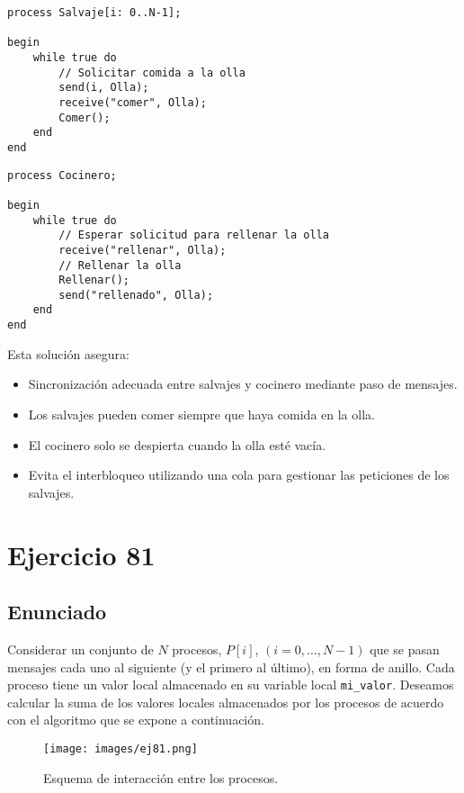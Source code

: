 \documentclass[a4paper,12pt]{article}
\begin{document}
\begin{lstlisting}[style=customcpp, caption={Pseudocódigo del proceso Salvaje}]
process Salvaje[i: 0..N-1];

begin
    while true do
        // Solicitar comida a la olla
        send(i, Olla);
        receive("comer", Olla);
        Comer();
    end
end
\end{lstlisting}

\begin{lstlisting}[style=customcpp, caption={Pseudocódigo del proceso Cocinero}]
process Cocinero;

begin
    while true do
        // Esperar solicitud para rellenar la olla
        receive("rellenar", Olla);
        // Rellenar la olla
        Rellenar();
        send("rellenado", Olla);
    end
end
\end{lstlisting}

Esta solución asegura:

\begin{itemize}
    \item Sincronización adecuada entre salvajes y cocinero mediante paso de mensajes.
    \item Los salvajes pueden comer siempre que haya comida en la olla.
    \item El cocinero solo se despierta cuando la olla esté vacía.
    \item Evita el interbloqueo utilizando una cola para gestionar las peticiones de los salvajes.
\end{itemize}



\section{Ejercicio 81}

\subsection{Enunciado}

Considerar un conjunto de $N$ procesos, $P[i]$, $(i = 0, \dots, N - 1)$ que se pasan mensajes cada uno al siguiente (y el primero al último), en forma de anillo. Cada proceso tiene un valor local almacenado en su variable local \texttt{mi\_valor}. Deseamos calcular la suma de los valores locales almacenados por los procesos de acuerdo con el algoritmo que se expone a continuación. 

\begin{figure}[H]
  \centering
  \texttt{[image: images/ej81.png]}
  \caption{Esquema de interacción entre los procesos.}
  \label{fig:ejercicio81}
\end{figure}
\end{document}
